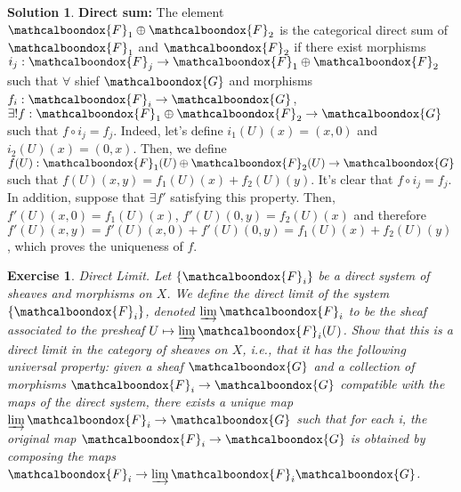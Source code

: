 \documentclass[12pt]{article}
\newtheorem{ex}{Exercise}[section]
\theoremstyle{definition}
\newtheorem*{sol}{Solution}
\newcommand{\sF}{\ensuremath{\mathcalboondox{F}}}
\newcommand{\sG}{\ensuremath{\mathcalboondox{G}}}
\begin{document}
\begin{sol}
	\textbf{Direct sum:} The element $\sF_1 \oplus \sF_2$ is the categorical direct sum of $\sF_1$ and $\sF_2$ if there exist morphisms $i_j: \sF_j \to  \sF_1 \oplus \sF_2$ such that $\forall$ shief $\sG$ and morphisms $f_i : \sF_i \to \sG$, $\exists ! f: \sF_1 \oplus \sF_2 \to \sG$ such that $f \circ i_j = f_j$. Indeed, let's define $i_1(U)(x) = (x,0)$ and $i_2(U)(x) = (0,x)$. Then, we define $f(U): \sF_1(U) \oplus \sF_2(U) \to \sG$ such that $f(U)(x,y) = f_1(U)(x) + f_2(U)(y)$. It's clear that $f \circ i_j = f_j$. In addition, suppose that $\exists f'$ satisfying this property. Then, $f'(U)(x,0) = f_1(U)(x)$, $f'(U)(0,y) = f_2(U)(x)$ and therefore $f'(U)(x,y) = f'(U)(x,0) + f'(U)(0,y) = f_1(U)(x) + f_2(U)(y)$, which proves the uniqueness of $f$.
\end{sol}

\begin{ex}
	Direct Limit. Let $\{\sF_i\}$ be a direct system of sheaves and morphisms on $X$. We define the direct limit of the system $\{\sF_i\}$, denoted $\varinjlim \sF_i$ to be the sheaf associated to the presheaf $U \mapsto \varinjlim \sF_i(U)$. Show that this is a direct limit in the category of sheaves on $X$, i.e., that it has the following universal property: given a sheaf $\sG$ and a collection of morphisms $\sF_i \to \sG$ compatible with the maps of the direct system, there exists a unique map $\varinjlim \sF_i \to \sG$ such that for each i, the original map $\sF_i \to \sG$ is obtained by composing the maps $\sF_i \to \varinjlim \sF_i \sG$.
\end{ex}
\end{document}
